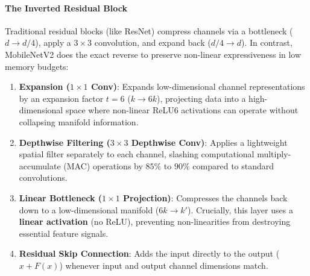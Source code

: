 \paragraph{The Inverted Residual Block}
Traditional residual blocks (like ResNet) compress channels via a bottleneck ($d \to d/4$), apply a $3 \times 3$ convolution, and expand back ($d/4 \to d$). In contrast, MobileNetV2 does the exact reverse to preserve non-linear expressiveness in low memory budgets:
\begin{enumerate}
    \item \textbf{Expansion ($1 \times 1$ Conv)}: Expands low-dimensional channel representations by an expansion factor $t = 6$ ($k \to 6k$), projecting data into a high-dimensional space where non-linear ReLU6 activations can operate without collapsing manifold information.
    \item \textbf{Depthwise Filtering ($3 \times 3$ Depthwise Conv)}: Applies a lightweight spatial filter separately to each channel, slashing computational multiply-accumulate (MAC) operations by $85\%$ to $90\%$ compared to standard convolutions.
    \item \textbf{Linear Bottleneck ($1 \times 1$ Projection)}: Compresses the channels back down to a low-dimensional manifold ($6k \to k'$). Crucially, this layer uses a \textbf{linear activation} (no ReLU), preventing non-linearities from destroying essential feature signals.
    \item \textbf{Residual Skip Connection}: Adds the input directly to the output ($x + F(x)$) whenever input and output channel dimensions match.
\end{enumerate}

